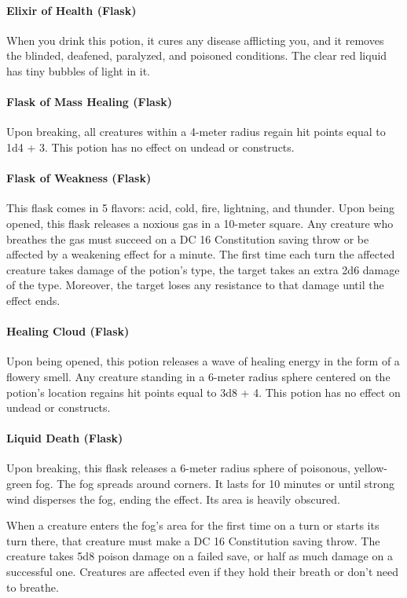     \paragraph{Elixir of Health (Flask)}
        When you drink this potion, it cures any disease afflicting you, and it removes the blinded, deafened, paralyzed, and poisoned conditions.
        The clear red liquid has tiny bubbles of light in it.
    \paragraph{Flask of Mass Healing (Flask)} %
        Upon breaking, all creatures within a 4-meter radius regain hit points equal to 1d4 + 3.
        This potion has no effect on undead or constructs.
    \paragraph{Flask of Weakness (Flask)} %
        This flask comes in 5 flavors: acid, cold, fire, lightning, and thunder.
        Upon being opened, this flask releases a noxious gas in a 10-meter square.
        Any creature who breathes the gas must succeed on a DC 16 Constitution saving throw or be affected by a weakening effect for a minute.
        The first time each turn the affected creature takes damage of the potion's type, the target takes an extra 2d6 damage of the type.
        Moreover, the target loses any resistance to that damage until the effect ends.
    \paragraph{Healing Cloud (Flask)} %
        Upon being opened, this potion releases a wave of healing energy in the form of a flowery smell.
        Any creature standing in a 6-meter radius sphere centered on the potion's location regains hit points equal to 3d8 + 4.
        This potion has no effect on undead or constructs.
    \paragraph{Liquid Death (Flask)} %
        Upon breaking, this flask releases a 6-meter radius sphere of poisonous, yellow-green fog.
        The fog spreads around corners.
        It lasts for 10 minutes or until strong wind disperses the fog, ending the effect.
        Its area is heavily obscured.

        When a creature enters the fog's area for the first time on a turn or starts its turn there, that creature must make a DC 16 Constitution saving throw.
        The creature takes 5d8 poison damage on a failed save, or half as much damage on a successful one.
        Creatures are affected even if they hold their breath or don't need to breathe.

